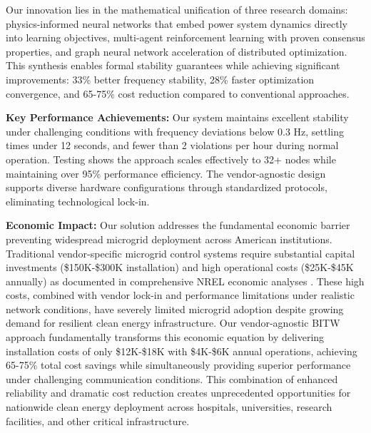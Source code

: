 \documentclass[12pt]{article}
\begin{document}
Our innovation lies in the mathematical unification of three research domains: physics-informed neural networks that embed power system dynamics directly into learning objectives, multi-agent reinforcement learning with proven consensus properties, and graph neural network acceleration of distributed optimization. This synthesis enables formal stability guarantees while achieving significant improvements: 33\% better frequency stability, 28\% faster optimization convergence, and 65-75\% cost reduction compared to conventional approaches.

\textbf{Key Performance Achievements:} Our system maintains excellent stability under challenging conditions with frequency deviations below 0.3 Hz, settling times under 12 seconds, and fewer than 2 violations per hour during normal operation. Testing shows the approach scales effectively to 32+ nodes while maintaining over 95\% performance efficiency. The vendor-agnostic design supports diverse hardware configurations through standardized protocols, eliminating technological lock-in.

\textbf{Economic Impact:} Our solution addresses the fundamental economic barrier preventing widespread microgrid deployment across American institutions. Traditional vendor-specific microgrid control systems require substantial capital investments (\$150K-\$300K installation) and high operational costs (\$25K-\$45K annually) as documented in comprehensive NREL economic analyses \cite{hirsch2018,sigrin2019}. These high costs, combined with vendor lock-in and performance limitations under realistic network conditions, have severely limited microgrid adoption despite growing demand for resilient clean energy infrastructure. Our vendor-agnostic BITW approach fundamentally transforms this economic equation by delivering installation costs of only \$12K-\$18K with \$4K-\$6K annual operations, achieving 65-75\% total cost savings while simultaneously providing superior performance under challenging communication conditions. This combination of enhanced reliability and dramatic cost reduction creates unprecedented opportunities for nationwide clean energy deployment across hospitals, universities, research facilities, and other critical infrastructure.
\end{document}
